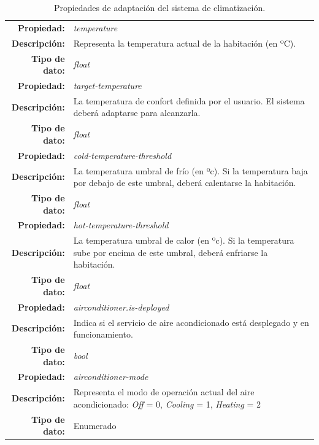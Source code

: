 \begin{table}[htb]
  \centering

  \begin{tabular}{|r p{11.5cm}|}
    \hline
    \textbf{Propiedad:} & \emph{temperature}  \\
    \textbf{Descripción:} & Representa la temperatura actual de la habitación (en ºC).  \\
    \textbf{Tipo de dato:} & \emph{float} \\
    \hline
    \textbf{Propiedad:} & \emph{target-temperature}  \\
    \textbf{Descripción:} & La temperatura de confort definida por el usuario. El sistema deberá adaptarse para alcanzarla.  \\
    \textbf{Tipo de dato:} & \emph{float} \\
    \hline
    \textbf{Propiedad:} & \emph{cold-temperature-threshold}  \\
    \textbf{Descripción:} & La temperatura umbral de frío (en ºc). Si la temperatura baja por debajo de este umbral, deberá calentarse la habitación. \\
    \textbf{Tipo de dato:} & \emph{float} \\
    \hline
    \textbf{Propiedad:} & \emph{hot-temperature-threshold}  \\
    \textbf{Descripción:} & La temperatura umbral de calor (en ºc). Si la temperatura sube por encima de este umbral, deberá enfriarse la habitación. \\
    \textbf{Tipo de dato:} & \emph{float} \\
    \hline
    \textbf{Propiedad:} & \emph{airconditioner.is-deployed}  \\
    \textbf{Descripción:} & Indica si el servicio de aire acondicionado está desplegado y en funcionamiento.  \\
    \textbf{Tipo de dato:} & \emph{bool} \\
    \hline
    \textbf{Propiedad:} & \emph{airconditioner-mode}  \\
    \textbf{Descripción:} & Representa el modo de operación actual del aire acondicionado: \emph{Off} = 0, \emph{Cooling} = 1, \emph{Heating} = 2  \\
    \textbf{Tipo de dato:} & Enumerado \\
    \hline
  \end{tabular}

  \caption{Propiedades de adaptación del sistema de climatización.}
  \label{tab:climatisation-adaption-properties}
\end{table}

